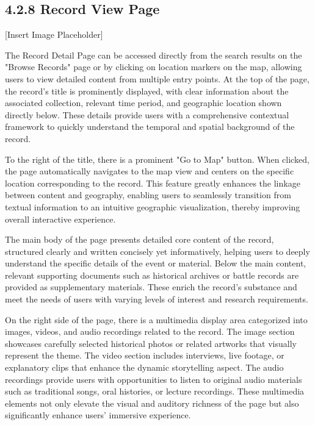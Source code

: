 \subsection*{4.2.8 Record View Page}
[Insert Image Placeholder]

The Record Detail Page can be accessed directly from the search results on the "Browse Records" page or by clicking on location markers on the map, allowing users to view detailed content from multiple entry points. At the top of the page, the record's title is prominently displayed, with clear information about the associated collection, relevant time period, and geographic location shown directly below. These details provide users with a comprehensive contextual framework to quickly understand the temporal and spatial background of the record.

To the right of the title, there is a prominent "Go to Map" button. When clicked, the page automatically navigates to the map view and centers on the specific location corresponding to the record. This feature greatly enhances the linkage between content and geography, enabling users to seamlessly transition from textual information to an intuitive geographic visualization, thereby improving overall interactive experience.

The main body of the page presents detailed core content of the record, structured clearly and written concisely yet informatively, helping users to deeply understand the specific details of the event or material. Below the main content, relevant supporting documents such as historical archives or battle records are provided as supplementary materials. These enrich the record's substance and meet the needs of users with varying levels of interest and research requirements.

On the right side of the page, there is a multimedia display area categorized into images, videos, and audio recordings related to the record. The image section showcases carefully selected historical photos or related artworks that visually represent the theme. The video section includes interviews, live footage, or explanatory clips that enhance the dynamic storytelling aspect. The audio recordings provide users with opportunities to listen to original audio materials such as traditional songs, oral histories, or lecture recordings. These multimedia elements not only elevate the visual and auditory richness of the page but also significantly enhance users' immersive experience.

